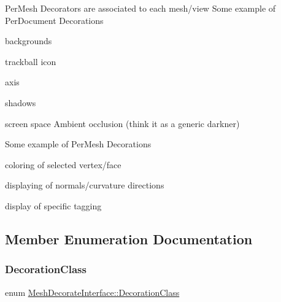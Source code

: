 Per\+Mesh Decorators are associated to each mesh/view Some example of Per\+Document Decorations
\begin{DoxyItemize}
\item backgrounds
\item trackball icon
\item axis
\item shadows
\item screen space Ambient occlusion (think it as a generic \textquotesingle{}darkner\textquotesingle{})
\end{DoxyItemize}

Some example of Per\+Mesh Decorations
\begin{DoxyItemize}
\item coloring of selected vertex/face
\item displaying of normals/curvature directions
\item display of specific tagging 
\end{DoxyItemize}

\subsection{Member Enumeration Documentation}
\mbox{\label{class_mesh_decorate_interface_ab781fd76c42ba9249b36b7eb16e10ed7}} 
\subsubsection{\texorpdfstring{Decoration\+Class}{DecorationClass}}
{\footnotesize\ttfamily enum \hyperlink{class_mesh_decorate_interface_ab781fd76c42ba9249b36b7eb16e10ed7}{Mesh\+Decorate\+Interface\+::\+Decoration\+Class}}

